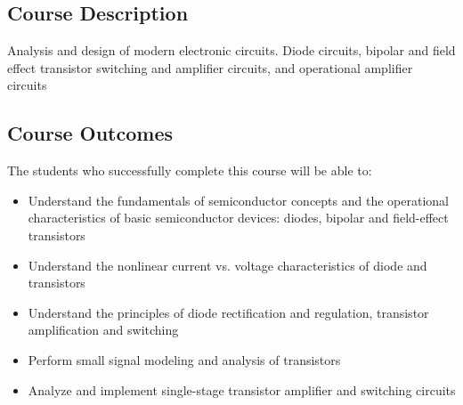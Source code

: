 \documentclass[10pt]{article}
\begin{document}
\subsection*{Course Description} 
Analysis and design of modern electronic circuits. Diode circuits, bipolar and field effect transistor switching and amplifier circuits, and operational amplifier circuits

\subsection*{Course Outcomes}
The students who successfully complete this course will be able to:
\begin{itemize}
    \item Understand the fundamentals of semiconductor concepts and the operational characteristics of basic semiconductor devices:  diodes, bipolar and field-effect transistors
    \item Understand the nonlinear current vs. voltage characteristics of diode and transistors
    \item Understand the principles of diode rectification and regulation, transistor amplification and switching
    \item Perform small signal modeling and analysis of transistors
    \item Analyze and implement single-stage transistor amplifier and switching circuits
\end{itemize}
\end{document}
